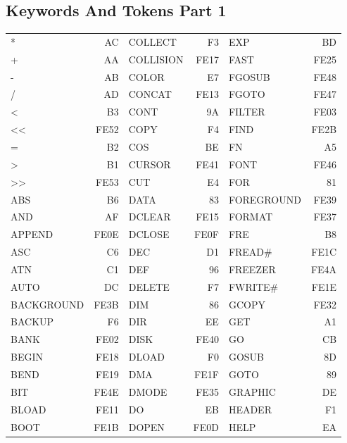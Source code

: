 \newpage
\subsection{Keywords And Tokens Part 1}
{\ttfamily
\setlength{\tabcolsep}{1mm}
\begin{center}
\begin{tabular}{|p{2.2cm}r|p{2.2cm}r|p{2.2cm}r|}
\hline
*          &   AC &COLLECT    &   F3 &EXP        &   BD \\
+          &   AA &COLLISION  & FE17 &FAST       & FE25 \\
-          &   AB &COLOR      &   E7 &FGOSUB     & FE48 \\
/          &   AD &CONCAT     & FE13 &FGOTO      & FE47 \\
<          &   B3 &CONT       &   9A &FILTER     & FE03 \\
<<         & FE52 &COPY       &   F4 &FIND       & FE2B \\
=          &   B2 &COS        &   BE &FN         &   A5 \\
>          &   B1 &CURSOR     & FE41 &FONT       & FE46 \\
>>         & FE53 &CUT        &   E4 &FOR        &   81 \\
ABS        &   B6 &DATA       &   83 &FOREGROUND & FE39 \\
AND        &   AF &DCLEAR     & FE15 &FORMAT     & FE37 \\
APPEND     & FE0E &DCLOSE     & FE0F &FRE        &   B8 \\
ASC        &   C6 &DEC        &   D1 &FREAD\#    & FE1C \\
ATN        &   C1 &DEF        &   96 &FREEZER    & FE4A \\
AUTO       &   DC &DELETE     &   F7 &FWRITE\#   & FE1E \\
BACKGROUND & FE3B &DIM        &   86 &GCOPY      & FE32 \\
BACKUP     &   F6 &DIR        &   EE &GET        &   A1 \\
BANK       & FE02 &DISK       & FE40 &GO         &   CB \\
BEGIN      & FE18 &DLOAD      &   F0 &GOSUB      &   8D \\
BEND       & FE19 &DMA        & FE1F &GOTO       &   89 \\
BIT        & FE4E &DMODE      & FE35 &GRAPHIC    &   DE \\
BLOAD      & FE11 &DO         &   EB &HEADER     &   F1 \\
BOOT       & FE1B &DOPEN      & FE0D &HELP       &   EA \\

\end{tabular}
\end{center}}
